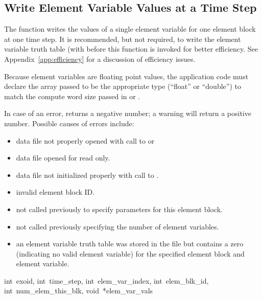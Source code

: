 \subsection{Write Element Variable Values at a Time Step}

The function  writes the values of a single
element variable for one element block at one time step. It is
recommended, but not required, to write the element variable truth
table (with  before this function is
invoked for better efficiency. See Appendix~\ref{app:efficiency} for a
discussion of efficiency issues.

Because element variables are floating point values, the application
code must declare the array passed to be the appropriate type
(``float'' or ``double'') to match the compute word size passed in
 or .


In case of an error,  returns a negative
number; a warning will return a positive number.  Possible causes of
errors include:

\begin{itemize}
 \item data file not properly opened with call to 
 or 

 \item data file opened for read only.

 \item data file not initialized properly with call to
 .

 \item invalid element block ID.

 \item {} not called previously to specify
 parameters for this element block.

 \item {} not called previously specifying
 the number of element variables.

 \item an element variable truth table was stored in the file but
 contains a zero (indicating no valid element variable) for the
 specified element block and element variable.
\end{itemize}



{int~exoid, 
int~time_step, 
int~elem_var_index,
int~elem_blk_id, 
int~num_elem_this_blk, 
void~*elem_var_vals}

